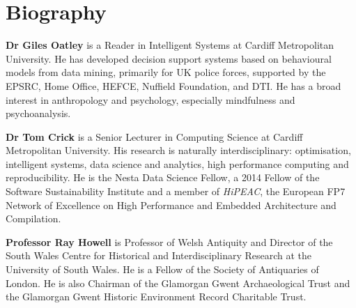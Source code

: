 \documentclass[11pt]{article}
\begin{document}
\section*{Biography}

{\textbf{Dr Giles Oatley}} is a Reader in Intelligent Systems at
Cardiff Metropolitan University. He has developed decision support
systems based on behavioural models from data mining, primarily for UK
police forces, supported by the EPSRC, Home Office, HEFCE, Nuffield
Foundation, and DTI. He has a broad interest in anthropology and
psychology, especially mindfulness and psychoanalysis.

{\textbf{Dr Tom Crick}} is a Senior Lecturer in Computing Science at
Cardiff Metropolitan University. His research is naturally
interdisciplinary: optimisation, intelligent systems, data science and
analytics, high performance computing and reproducibility. He is the
Nesta Data Science Fellow, a 2014 Fellow of the Software
Sustainability Institute and a member of {\emph{HiPEAC}}, the European
FP7 Network of Excellence on High Performance and Embedded
Architecture and Compilation.

{\textbf{Professor Ray Howell}} is Professor of Welsh Antiquity and
Director of the South Wales Centre for Historical and
Interdisciplinary Research at the University of South Wales. He is a
Fellow of the Society of Antiquaries of London. He is also Chairman of
the Glamorgan Gwent Archaeological Trust and the Glamorgan Gwent
Historic Environment Record Charitable Trust.





\end{document}
